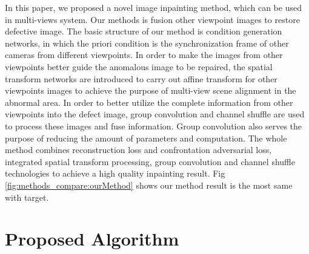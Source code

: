 \documentclass{IEEE_lsens}
\begin{document}
In this paper, we proposed a novel image inpainting method, which can be used in multi-views system. Our methods is fusion other viewpoint images to restore defective image. The basic structure of our method is condition generation networks, in which the priori condition is the synchronization frame of other cameras from different viewpoints.  In order to make the images from other viewpoints better guide the anomalous image to be repaired, the spatial transform networks \cite{Jaderberg2015::Spatial} are introduced to carry out affine transform for other viewpoints images to achieve the purpose of multi-view scene alignment in the abnormal area. In order to better utilize the complete information from other viewpoints into the defect image, group convolution \cite{Howard2017:apa:Mobilenets} and channel shuffle \cite{Zhang2017:apa:Shufflenet} are used to process these images and fuse information. Group convolution  also serves the purpose of reducing the amount of parameters and computation. The whole method combines reconstruction loss and confrontation adversarial loss, integrated spatial transform processing, group convolution and channel shuffle technologies to achieve a high quality inpainting result. Fig \ref{fig:methods_compare:ourMethod} shows our method result is the most same with target.

\section{Proposed Algorithm}
\end{document}
